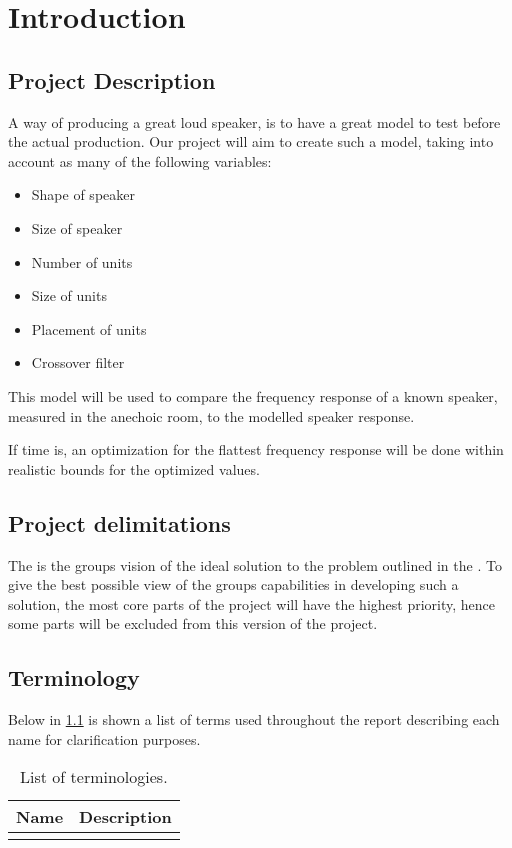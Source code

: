 
\chapter{Introduction}
\label{sec:introduction}

\section{Project Description}
\label{sec:projectDescription}
A way of producing a great loud speaker, is to have a great model to test before the actual production. Our project will aim to create such a model, taking into account as many of the following variables:

\begin{itemize}
	\item Shape of speaker
	\item Size of speaker
	\item Number of units
	\item Size of units
	\item Placement of units
	\item Crossover filter
\end{itemize}

This model will be used to compare the frequency response of a known speaker, measured in the anechoic room, to the modelled speaker response.

If time is, an optimization for the flattest frequency response will be done within realistic bounds for the optimized values.


\section{Project delimitations}
\label{sec:delimitations}
The  is the groups vision of the ideal solution to the problem outlined in the .  
To give the best possible view of the groups capabilities in developing such a solution, the most core parts of the project will have the highest priority, hence some parts will be excluded from this version of the project. 

\section{Terminology}
\label{sec:terminology}
Below in \cref{tab:terminology} is shown a list of terms used throughout the report describing each name for clarification purposes.

\begin{table}[H]
	\centering
	\begin{tabularx}{0.8\textwidth}{l X}
		\toprule
		\textbf{Name} & \textbf{Description} \\
		\midrule
		&\\
		\bottomrule
	\end{tabularx}
	\caption{List of terminologies.}
	\label{tab:terminology}
\end{table}